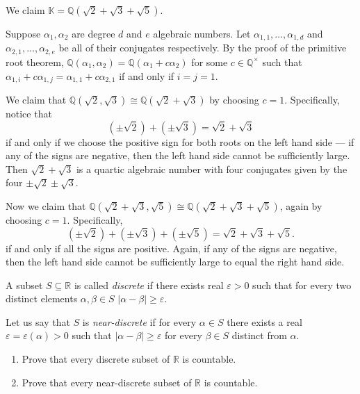 \documentclass[12 pt, letterpaper]{hmcpset}
\begin{document}
\begin{solution}
	We claim $\mathbb{K} = \mathbb{Q}(\sqrt{2} + \sqrt{3} + \sqrt{5})$.

	Suppose $\alpha_{1}, \alpha_{2}$ are degree $d$ and $e$ algebraic numbers. Let $\alpha_{1, 1}, \dots, \alpha_{1, d}$ and $\alpha_{2, 1}, \dots, \alpha_{2, e}$ be all of their conjugates respectively. By the proof of the primitive root theorem, $\mathbb{Q}(\alpha_{1}, \alpha_{2}) = \mathbb{Q}(\alpha_{1} + c \alpha_{2})$ for some $c \in \mathbb{Q}^{\times}$ such that $\alpha_{1, i} + c \alpha_{1, j} = \alpha_{1, 1} + c \alpha_{2, 1}$ if and only if $i = j = 1$.

	We claim that $\mathbb{Q}(\sqrt{2}, \sqrt{3}) \cong \mathbb{Q}(\sqrt{2} + \sqrt{3})$ by choosing $c = 1$. Specifically, notice that
	\[
		(\pm \sqrt{2}) + (\pm \sqrt{3}) = \sqrt{2} + \sqrt{3}
	\]
	if and only if we choose the positive sign for both roots on the left hand side --- if any of the signs are negative, then the left hand side cannot be sufficiently large. Then $\sqrt{2} +\sqrt{3}$ is a quartic algebraic number with four conjugates given by the four $\pm \sqrt{2} \pm \sqrt{3}$. 

	Now we claim that $\mathbb{Q}(\sqrt{2} + \sqrt{3}, \sqrt{5}) \cong \mathbb{Q}(\sqrt{2} + \sqrt{3} + \sqrt{5})$, again by choosing $c = 1$. Specifically,
	\[
		(\pm \sqrt{2}) + (\pm \sqrt{3}) + (\pm \sqrt{5}) = \sqrt{2} + \sqrt{3} + \sqrt{5}.
	\]
	if and only if all the signs are positive. Again, if any of the signs are negative, then the left hand side cannot be sufficiently large to equal the right hand side.
\end{solution}

\pagebreak

\begin{problem}[Problem 3.]
	A subset $S \subseteq \mathbb{R}$ is called \emph{discrete} if there exists real $\varepsilon > 0$ such that for every two distinct elements $\alpha, \beta \in S$ $\lvert \alpha - \beta \rvert \ge \varepsilon$.

	Let us say that $S$ is \emph{near-discrete} if for every $\alpha \in S$ there exists a real $\varepsilon = \varepsilon(\alpha) > 0$ such that $\lvert \alpha - \beta \rvert \ge \varepsilon$ for every $\beta \in S$ distinct from $\alpha$.
	\begin{enumerate}
		\item Prove that every discrete subset of $\mathbb{R}$ is countable.
		\item Prove that every near-discrete subset of $\mathbb{R}$ is countable.
	\end{enumerate}
\end{problem}
\end{document}
